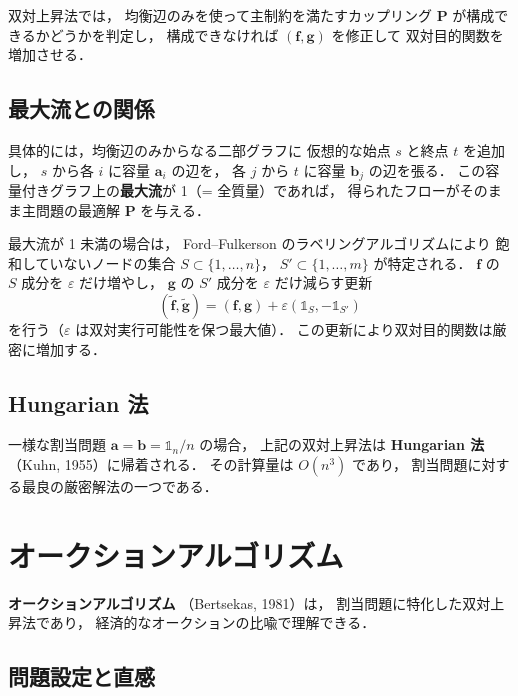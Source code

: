 双対上昇法では，
均衡辺のみを使って主制約を満たすカップリング $\mathbf{P}$
が構成できるかどうかを判定し，
構成できなければ $(\mathbf{f}, \mathbf{g})$ を修正して
双対目的関数を増加させる．

\subsection{最大流との関係}\label{subsec:da-maxflow}

具体的には，均衡辺のみからなる二部グラフに
仮想的な始点 $s$ と終点 $t$ を追加し，
$s$ から各 $i$ に容量 $\mathbf{a}_i$ の辺を，
各 $j$ から $t$ に容量 $\mathbf{b}_j$ の辺を張る．
この容量付きグラフ上の\textbf{最大流}が 1（= 全質量）であれば，
得られたフローがそのまま主問題の最適解 $\mathbf{P}$ を与える．

最大流が 1 未満の場合は，
Ford--Fulkerson のラベリングアルゴリズムにより
飽和していないノードの集合 $S \subset \{1,\ldots,n\}$，
$S' \subset \{1,\ldots,m\}$ が特定される．
$\mathbf{f}$ の $S$ 成分を $\varepsilon$ だけ増やし，
$\mathbf{g}$ の $S'$ 成分を $\varepsilon$ だけ減らす更新
\[
  (\tilde{\mathbf{f}}, \tilde{\mathbf{g}})
  = (\mathbf{f}, \mathbf{g})
  + \varepsilon(\mathbb{1}_S, -\mathbb{1}_{S'})
\]
を行う（$\varepsilon$ は双対実行可能性を保つ最大値）．
この更新により双対目的関数は厳密に増加する．

\subsection{Hungarian 法}\label{subsec:hungarian}

一様な割当問題
$\mathbf{a} = \mathbf{b} = \mathbb{1}_n / n$ の場合，
上記の双対上昇法は
\textbf{Hungarian 法}（Kuhn, 1955）に帰着される．
その計算量は $O(n^3)$ であり，
割当問題に対する最良の厳密解法の一つである．


\section{オークションアルゴリズム}\label{sec:auction}

\textbf{オークションアルゴリズム}
（Bertsekas, 1981）は，
割当問題に特化した双対上昇法であり，
経済的なオークションの比喩で理解できる．

\subsection{問題設定と直感}\label{subsec:auction-intuition}

